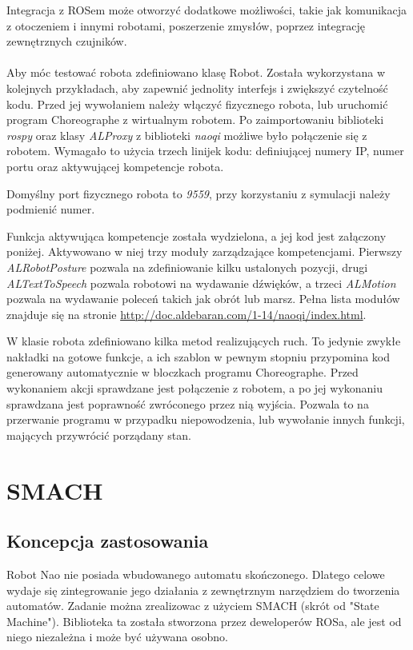 Integracja z ROSem może otworzyć dodatkowe możliwości, takie jak komunikacja z otoczeniem i innymi robotami, poszerzenie zmysłów, poprzez integrację zewnętrznych czujników. 
\\\\
Aby móc testować robota zdefiniowano klasę Robot. Została wykorzystana w kolejnych przykładach, aby zapewnić jednolity interfejs i zwiększyć czytelność kodu. Przed jej wywołaniem należy włączyć fizycznego robota, lub uruchomić program Choreographe z wirtualnym robotem.
Po zaimportowaniu biblioteki \textit{rospy} oraz klasy \textit{ALProxy} z biblioteki \textit{naoqi} możliwe było połączenie się z robotem. Wymagało to użycia trzech linijek kodu: definiującej numery IP, numer portu oraz aktywującej kompetencje robota.

Domyślny port fizycznego robota to \textit{9559}, przy korzystaniu z symulacji należy podmienić numer.



Funkcja aktywująca kompetencje została wydzielona, a jej kod jest załączony poniżej. Aktywowano w niej trzy moduły zarządzające kompetencjami. Pierwszy \textit{ALRobotPosture} pozwala na zdefiniowanie kilku ustalonych pozycji, drugi \textit{ALTextToSpeech} pozwala robotowi na wydawanie dźwięków, a trzeci \textit{ALMotion} pozwala na wydawanie poleceń takich jak obrót lub marsz. Pełna lista modułów znajduje się na stronie \url{http://doc.aldebaran.com/1-14/naoqi/index.html}. 


W klasie robota zdefiniowano kilka metod realizujących ruch. To jedynie zwykłe nakładki na gotowe funkcje, a ich szablon w pewnym stopniu przypomina kod generowany automatycznie w bloczkach programu Choreographe. Przed wykonaniem akcji sprawdzane jest połączenie z robotem, a po jej wykonaniu sprawdzana jest poprawność zwróconego przez nią wyjścia. Pozwala to na przerwanie programu w przypadku niepowodzenia, lub wywołanie innych funkcji, mających przywrócić porządany stan. 



\section{SMACH}

\subsection{Koncepcja zastosowania}
Robot Nao nie posiada wbudowanego automatu skończonego. Dlatego celowe wydaje się zintegrowanie jego działania z zewnętrznym narzędziem do tworzenia automatów. 
Zadanie można zrealizowac z użyciem SMACH (skrót od "State Machine"). Biblioteka ta została stworzona przez deweloperów ROSa, ale jest od niego niezależna i może być używana osobno. 

